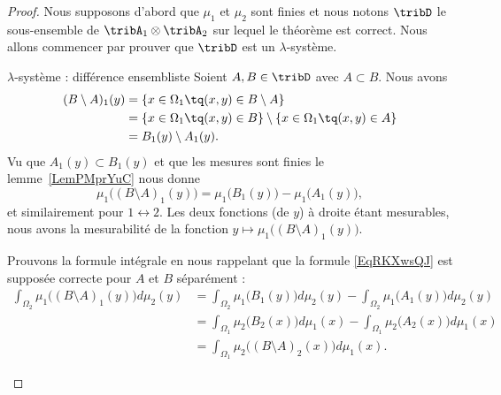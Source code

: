 \begin{proof}
    Nous supposons d'abord que \( \mu_1\) et \( \mu_2\) sont finies et nous notons \( \tribD\) le sous-ensemble de \( \tribA_1\otimes \tribA_2\) sur lequel le théorème est correct. Nous allons commencer par prouver que \( \tribD\) est un \( \lambda\)-système.

    \begin{subproof}
        \item[\( \lambda\)-système : différence ensembliste]
            Soient \( A,B\in\tribD\) avec \( A\subset B\). Nous avons
            \begin{subequations}
                \begin{align}
                    (B\setminus A)_1(y)&=\{ x\in \Omega_1\tq(x,y)\in B\setminus A \}\\
                    &=\{ x\in \Omega_1\tq(x,y)\in B\}\setminus\{ x\in \Omega_1\tq(x,y)\in  A \}\\
                    &=B_1(y)\setminus A_1(y).
                \end{align}
            \end{subequations}
            Vu que \( A_1(y)\subset B_1(y)\) et que les mesures sont finies le lemme~\ref{LemPMprYuC} nous donne
            \begin{equation}
                \mu_1\big( (B\setminus A)_1(y) \big)=\mu_1\big( B_1(y) \big)-\mu_1\big( A_1(y) \big),
            \end{equation}
            et similairement pour \( 1\leftrightarrow 2\). Les deux fonctions (de \( y\)) à droite étant mesurables, nous avons la mesurabilité de la fonction \( y\mapsto \mu_1\big( (B\setminus A)_1(y) \big)\).

            Prouvons la formule intégrale en nous rappelant que la formule \eqref{EqRKXwsQJ} est supposée correcte pour \( A\) et \( B\) séparément :
            \begin{subequations}
                \begin{align}
                    \int_{\Omega_2}\mu_1\big( (B\setminus A)_1(y) \big)d\mu_2(y)&=\int_{\Omega_2}\mu_1\big( B_1(y) \big)d\mu_2(y)-\int_{\Omega_2}\mu_1\big( A_1(y) \big)d\mu_2(y)\\
                    &=\int_{\Omega_1}\mu_2\big( B_2(x) \big)d\mu_1(x)-\int_{\Omega_1}\mu_2\big( A_2(x) \big)d\mu_1(x)\\
                    &=\int_{\Omega_1}\mu_2\big( (B\setminus A)_2(x) \big)d\mu_1(x).
                \end{align}
            \end{subequations}



\end{subproof}
\end{proof}
